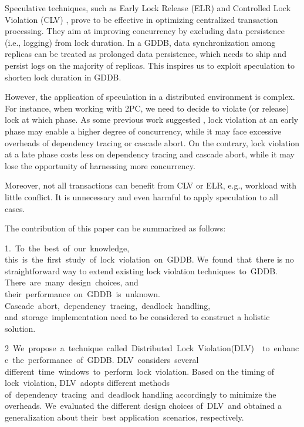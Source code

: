 \documentclass[conference]{IEEEtran}
\begin{document}
Speculative techniques, such as Early Lock Release (ELR) \cite{EfficientLocking:conf/vldb/KimuraGK12} and Controlled Lock Violation (CLV)
\cite{CLV:conf/sigmod/GraefeLKTV13}, prove to be effective in optimizing centralized transaction processing.
They aim at improving concurrency by excluding data persistence (i.e., logging) from lock duration.
In a GDDB, data synchronization among replicas can be treated as prolonged data persistence, which needs to ship and persist logs on the majority of replicas.
This inspires us to exploit speculation to shorten lock duration in GDDB.

However, the application of speculation in a distributed environment is complex.
For instance, when working with 2PC, we need to decide to violate (or release) lock at which phase.
As some previous work suggested \cite{CLV:conf/sigmod/GraefeLKTV13}, lock violation at an early phase may enable a higher degree of concurrency,
while it may face excessive overheads of dependency tracing or cascade abort.
On the contrary, lock violation at a late phase costs less on dependency tracing and cascade abort,
while it may lose the opportunity of harnessing more concurrency.

Moreover, not all transactions can benefit from CLV or ELR, e.g., workload with little conflict.
It is unnecessary and even harmful to apply speculation to all cases.

The contribution of this paper can be summarized as follows:
\begin{highlighted}
  

1. To the best of our knowledge, this is the first study of lock violation on GDDB.
We found that there is no straightforward way to extend existing lock violation techniques to GDDB. 
There are many design choices, and their performance on GDDB is unknown. 
Cascade abort, dependency tracing, deadlock handling, and storage implementation need to be considered to construct a holistic solution.  

2 We propose a technique called Distributed Lock Violation(DLV)  to enhance the performance of GDDB.
DLV considers several different time windows to perform lock violation.
Based on the timing of lock violation, DLV adopts different methods of dependency tracing and deadlock handling accordingly to minimize the overheads.
We evaluated the different design choices of DLV and obtained a generalization about their best application scenarios, respectively.
\end{highlighted}
\end{document}
